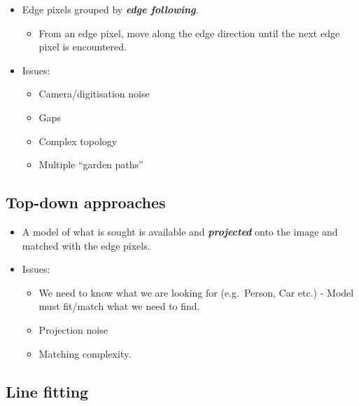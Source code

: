 \documentclass[english, 10pt]{article}
\begin{document}
\begin{itemize}
\itemsep1pt\parskip0pt
\item
  Edge pixels grouped by \textbf{\emph{edge following}}.

  \begin{itemize}
  \itemsep1pt\parskip0pt
  \item
    From an edge pixel, move along the edge direction until the next
    edge pixel is encountered.
  \end{itemize}
\item
  Issues:

  \begin{itemize}
  \itemsep1pt\parskip0pt
  \item
    Camera/digitisation noise
  \item
    Gaps
  \item
    Complex topology
  \item
    Multiple ``garden paths''
  \end{itemize}
\end{itemize}

\subsection{Top-down approaches}\label{top-down-approaches}

\begin{itemize}
\item
  A model of what is sought is available and \textbf{\emph{projected}}
  onto the image and matched with the edge pixels.
\item
  Issues:

  \begin{itemize}
  \itemsep1pt\parskip0pt
  \item
    We need to know what we are looking for (e.g.~Person, Car etc.) -
    Model must fit/match what we need to find.
  \item
    Projection noise
  \item
    Matching complexity.
  \end{itemize}
\end{itemize}

\subsection{Line fitting}\label{line-fitting}
\end{document}
